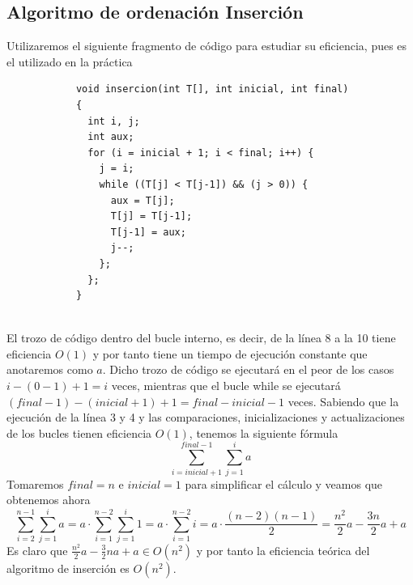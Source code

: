 \documentclass[11pt]{article}
\begin{document}
        \subsection*{Algoritmo de ordenación Inserción}
        Utilizaremos el siguiente fragmento de código para estudiar su eficiencia, pues es el utilizado en la práctica
        \begin{lstlisting}
            void insercion(int T[], int inicial, int final)
            {
              int i, j;
              int aux;
              for (i = inicial + 1; i < final; i++) {
                j = i;
                while ((T[j] < T[j-1]) && (j > 0)) {
                  aux = T[j];
                  T[j] = T[j-1];
                  T[j-1] = aux;
                  j--;
                };
              };
            }
            
        \end{lstlisting}
        El trozo de código dentro del bucle interno, es decir, de la línea 8 a la 10 tiene eficiencia $O(1)$ y por tanto
        tiene un tiempo de ejecución constante que anotaremos como $a$. Dicho trozo de código se ejecutará en el peor de los casos
        $i-(0-1)+1=i$ veces, mientras que el bucle while se ejecutará $(final-1)-(inicial+1)+1=final-inicial-1$ veces.
        Sabiendo que la ejecución de la línea 3 y 4 y las comparaciones, inicializaciones y actualizaciones de los bucles tienen eficiencia $O(1)$, 
        tenemos la siguiente fórmula
        \begin{equation*}
            \sum_{i=inicial+1}^{final-1} \sum_{j=1}^{i}a
        \end{equation*}
        Tomaremos $final =  n$ e $inicial = 1$ para simplificar el cálculo y veamos que obtenemos ahora
        \begin{equation*}
            \sum_{i=2}^{n-1} \sum_{j=1}^{i}a= a \cdot \sum_{i=1}^{n-2} \sum_{j=1}^{i}1= a \cdot \sum_{i=1}^{n-2} i
            = a \cdot \frac{(n-2)(n-1)}{2}=\frac{n^2}{2}a-\frac{3n}{2}a+a 
        \end{equation*}
        Es claro que $\frac{n^2}{2}a-\frac{3}{2}na+a \in O(n^2)$ y por tanto la eficiencia teórica del algoritmo de inserción es $O(n^2)$.
        
\end{document}
